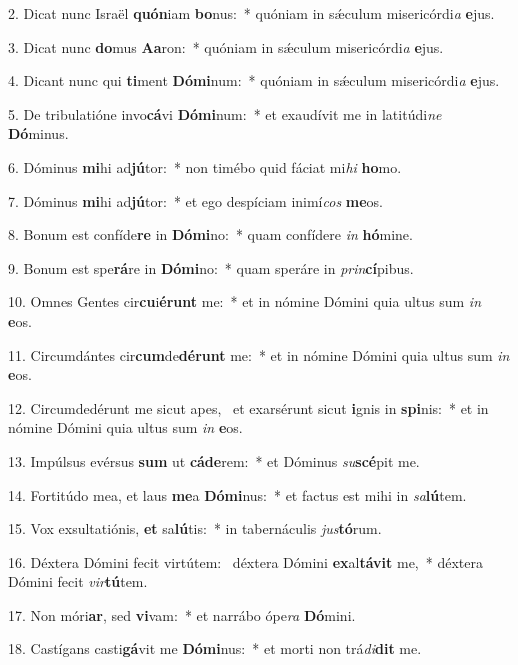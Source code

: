 2. Dicat nunc Israël \textbf{quón}iam \textbf{bo}nus:~*  quóniam in sǽculum misericórdi\textit{a} \textbf{e}jus.\

3. Dicat nunc \textbf{do}mus \textbf{A}\textbf{a}ron:~*  quóniam in sǽculum misericórdi\textit{a} \textbf{e}jus.\

4. Dicant nunc qui \textbf{ti}ment \textbf{Dó}\textbf{mi}num:~*  quóniam in sǽculum misericórdi\textit{a} \textbf{e}jus.\

5. De tribulatióne invo\textbf{cá}vi \textbf{Dó}\textbf{mi}num:~*  et exaudívit me in latitúdi\textit{ne} \textbf{Dó}minus.\

6. Dóminus \textbf{mi}hi ad\textbf{jú}tor:~*  non timébo quid fáciat mi\textit{hi} \textbf{ho}mo.\

7. Dóminus \textbf{mi}hi ad\textbf{jú}tor:~*  et ego despíciam inimí\textit{cos} \textbf{me}os.\

8. Bonum est confíde\textbf{re} in \textbf{Dó}\textbf{mi}no:~*  quam confídere \textit{in} \textbf{hó}mine.\

9. Bonum est spe\textbf{rá}re in \textbf{Dó}\textbf{mi}no:~*  quam speráre in \textit{prin}\textbf{cí}pibus.\

10. Omnes Gentes cir\textbf{cu}i\textbf{é}\textbf{runt} me:~*  et in nómine Dómini quia ultus sum \textit{in} \textbf{e}os.\

11. Circumdántes cir\textbf{cum}de\textbf{dé}\textbf{runt} me:~*  et in nómine Dómini quia ultus sum \textit{in} \textbf{e}os.\

12. Circumdedérunt me sicut apes, \dag\  et exarsérunt sicut \textbf{i}gnis in \textbf{spi}nis:~*  et in nómine Dómini quia ultus sum \textit{in} \textbf{e}os.\

13. Impúlsus evérsus \textbf{sum} ut \textbf{cá}\textbf{de}rem:~*  et Dóminus \textit{su}\textbf{scé}pit me.\

14. Fortitúdo mea, et laus \textbf{me}a \textbf{Dó}\textbf{mi}nus:~*  et factus est mihi in \textit{sa}\textbf{lú}tem.\

15. Vox exsultatiónis, \textbf{et} sa\textbf{lú}tis:~*  in tabernáculis \textit{jus}\textbf{tó}rum.\

16. Déxtera Dómini fecit virtútem: \dag\  déxtera Dómini \textbf{ex}al\textbf{tá}\textbf{vit} me,~*  déxtera Dómini fecit \textit{vir}\textbf{tú}tem.\

17. Non móri\textbf{ar}, sed \textbf{vi}vam:~*  et narrábo ópe\textit{ra} \textbf{Dó}mini.\

18. Castígans casti\textbf{gá}vit me \textbf{Dó}\textbf{mi}nus:~*  et morti non trá\textit{di}\textbf{dit} me.\

